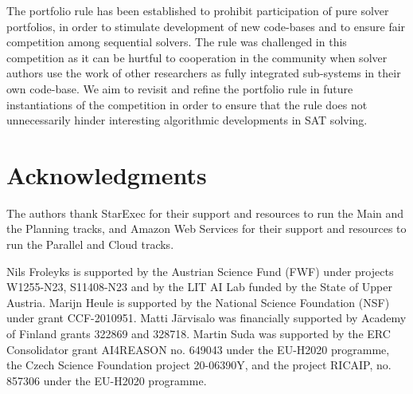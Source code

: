 \documentclass{elsarticle}
\begin{document}
The portfolio rule has been established to prohibit participation of pure solver portfolios, in order to stimulate development of new code-bases and
to ensure fair competition among  sequential solvers.
The rule was challenged in this competition as it can be hurtful to cooperation in the community when solver authors use the work of other researchers as fully integrated sub-systems in their own code-base. 
We aim to revisit and refine the portfolio rule in future instantiations of the competition in order to ensure that the rule does not unnecessarily hinder interesting 
algorithmic developments in SAT solving.

\section*{Acknowledgments}
The authors thank StarExec for their support and resources to run the Main and the Planning tracks, and Amazon Web Services 
for their support and resources to run the Parallel and Cloud tracks. 

Nils Froleyks is supported by the Austrian Science Fund (FWF) under projects
W1255-N23, S11408-N23 and by the LIT AI Lab funded by the State of Upper
Austria.
%
Marijn Heule is supported by the National Science Foundation (NSF) under grant CCF-2010951. 
%
Matti J\"arvisalo was financially supported by Academy of Finland grants 322869 and 328718.
%
Martin Suda was supported by the ERC Consolidator grant AI4REASON no. 649043 under the EU-H2020 programme,
the Czech Science Foundation project 20-06390Y, and the project RICAIP, no. 857306 under the EU-H2020 programme.





\end{document}
